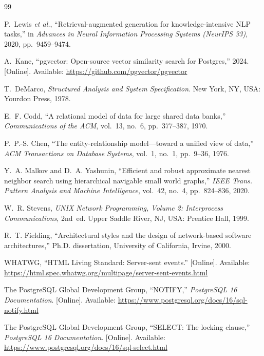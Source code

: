 \documentclass[11pt,a4paper,oneside]{report}
\begin{document}
\renewcommand{\bibname}{References}
\begin{thebibliography}{99}

P.~Lewis \emph{et al.}, ``Retrieval-augmented generation for knowledge-intensive NLP
tasks,'' in \emph{Advances in Neural Information Processing Systems (NeurIPS 33)}, 2020,
pp.~9459--9474.

A.~Kane, ``pgvector: Open-source vector similarity search for Postgres,'' 2024. [Online].
Available: \url{https://github.com/pgvector/pgvector}

T.~DeMarco, \emph{Structured Analysis and System Specification}. New York, NY, USA: Yourdon
Press, 1978.

E.~F. Codd, ``A relational model of data for large shared data banks,''
\emph{Communications of the ACM}, vol.~13, no.~6, pp.~377--387, 1970.

P.~P.-S. Chen, ``The entity-relationship model---toward a unified view of data,''
\emph{ACM Transactions on Database Systems}, vol.~1, no.~1, pp.~9--36, 1976.

Y.~A. Malkov and D.~A. Yashunin, ``Efficient and robust approximate nearest neighbor search
using hierarchical navigable small world graphs,'' \emph{IEEE Trans. Pattern Analysis and
Machine Intelligence}, vol.~42, no.~4, pp.~824--836, 2020.

W.~R. Stevens, \emph{UNIX Network Programming, Volume 2: Interprocess Communications},
2nd~ed. Upper Saddle River, NJ, USA: Prentice Hall, 1999.

R.~T. Fielding, ``Architectural styles and the design of network-based software
architectures,'' Ph.D. dissertation, University of California, Irvine, 2000.

WHATWG, ``HTML Living Standard: Server-sent events.'' [Online]. Available:
\url{https://html.spec.whatwg.org/multipage/server-sent-events.html}

The PostgreSQL Global Development Group, ``NOTIFY,'' \emph{PostgreSQL 16 Documentation}.
[Online]. Available: \url{https://www.postgresql.org/docs/16/sql-notify.html}

The PostgreSQL Global Development Group, ``SELECT: The locking clause,'' \emph{PostgreSQL 16
Documentation}. [Online]. Available:
\url{https://www.postgresql.org/docs/16/sql-select.html}


\end{thebibliography}
\end{document}
